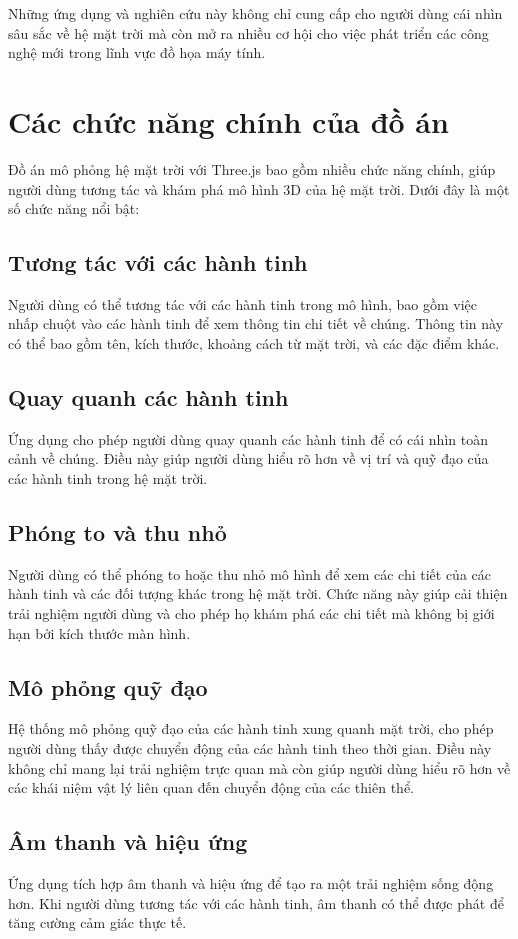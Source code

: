 \documentclass[14pt]{extarticle}
\begin{document}
Những ứng dụng và nghiên cứu này không chỉ cung cấp cho người dùng cái nhìn sâu sắc về hệ mặt trời mà còn mở ra nhiều cơ hội cho việc phát triển các công nghệ mới trong lĩnh vực đồ họa máy tính.
\section{Các chức năng chính của đồ án}
Đồ án mô phỏng hệ mặt trời với Three.js bao gồm nhiều chức năng chính, giúp người dùng tương tác và khám phá mô hình 3D của hệ mặt trời. Dưới đây là một số chức năng nổi bật:

\subsection{Tương tác với các hành tinh}
Người dùng có thể tương tác với các hành tinh trong mô hình, bao gồm việc nhấp chuột vào các hành tinh để xem thông tin chi tiết về chúng. Thông tin này có thể bao gồm tên, kích thước, khoảng cách từ mặt trời, và các đặc điểm khác.

\subsection{Quay quanh các hành tinh}
Ứng dụng cho phép người dùng quay quanh các hành tinh để có cái nhìn toàn cảnh về chúng. Điều này giúp người dùng hiểu rõ hơn về vị trí và quỹ đạo của các hành tinh trong hệ mặt trời.

\subsection{Phóng to và thu nhỏ}
Người dùng có thể phóng to hoặc thu nhỏ mô hình để xem các chi tiết của các hành tinh và các đối tượng khác trong hệ mặt trời. Chức năng này giúp cải thiện trải nghiệm người dùng và cho phép họ khám phá các chi tiết mà không bị giới hạn bởi kích thước màn hình.

\subsection{Mô phỏng quỹ đạo}
Hệ thống mô phỏng quỹ đạo của các hành tinh xung quanh mặt trời, cho phép người dùng thấy được chuyển động của các hành tinh theo thời gian. Điều này không chỉ mang lại trải nghiệm trực quan mà còn giúp người dùng hiểu rõ hơn về các khái niệm vật lý liên quan đến chuyển động của các thiên thể.

\subsection{Âm thanh và hiệu ứng}
Ứng dụng tích hợp âm thanh và hiệu ứng để tạo ra một trải nghiệm sống động hơn. Khi người dùng tương tác với các hành tinh, âm thanh có thể được phát để tăng cường cảm giác thực tế.
\end{document}
